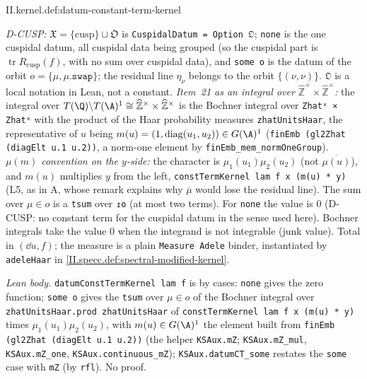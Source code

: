 \begin{tfformal}{II.kernel.def:datum-constant-term-kernel}
\begin{tffidelity}
\emph{D-CUSP:} $\mathfrak X=\{\mathrm{cusp}\}\sqcup\mathfrak O$ is \texttt{CuspidalDatum = Option 𝔒}; \texttt{none} is the one cuspidal datum, all cuspidal data being grouped (so the cuspidal part is $\operatorname{tr}R_{\mathrm{cusp}}(f)$, with no sum over cuspidal data), and \texttt{some o} is the datum of the orbit $o=\{\mu,\mu.\texttt{swap}\}$; the residual line $\eta_\nu$ belongs to the orbit $\{(\nu,\nu)\}$. \texttt{𝔒} is a local notation in Lean, not a constant. \emph{Item~21 as an integral over $\widehat{\mathbb Z}^\times\times\widehat{\mathbb Z}^\times$:} the integral over $T(\Q)\backslash T(\A)^1\cong\widehat{\mathbb Z}^\times\times\widehat{\mathbb Z}^\times$ is the Bochner integral over \texttt{Zhatˣ × Zhatˣ} with the product of the Haar probability measures \texttt{zhatUnitsHaar}, the representative of $u$ being $m(u)=(1,\operatorname{diag}(u_1,u_2))\in G(\A)^1$ (\texttt{finEmb (gl2Zhat (diagElt u.1 u.2))}, a norm-one element by \texttt{finEmb\_mem\_normOneGroup}). \emph{$\mu(m)$ convention on the $y$-side:} the character is $\mu_1(u_1)\mu_2(u_2)$ (not $\overline{\mu(u)}$), and $m(u)$ multiplies $y$ from the left, \texttt{constTermKernel lam f x (m(u) * y)} (L5, as in A, whose remark explains why $\bar\mu$ would lose the residual line). The sum over $\mu\in o$ is a \texttt{tsum} over \texttt{↥o} (at most two terms). For \texttt{none} the value is $0$ (D-CUSP: no constant term for the cuspidal datum in the sense used here). Bochner integrals take the value $0$ when the integrand is not integrable (junk value). Total in $(\dd u,f)$; the measure is a plain \texttt{Measure Adele} binder, instantiated by \texttt{adeleHaar} in \cref{II.specc.def:spectral-modified-kernel}.
\end{tffidelity}
\end{tfformal}
\noindent\emph{Lean body.} \texttt{datumConstTermKernel lam f} is by cases: \texttt{none} gives the zero function; \texttt{some o} gives the \texttt{tsum} over $\mu\in o$ of the Bochner integral over \texttt{zhatUnitsHaar.prod zhatUnitsHaar} of \texttt{constTermKernel lam f x (m(u) * y)} times $\mu_1(u_1)\mu_2(u_2)$, with $m(u)\in G(\A)^1$ the element built from \texttt{finEmb (gl2Zhat (diagElt u.1 u.2))} (the helper \texttt{KSAux.mZ}; \texttt{KSAux.mZ\_mul}, \texttt{KSAux.mZ\_one}, \texttt{KSAux.continuous\_mZ}); \texttt{KSAux.datumCT\_some} restates the \texttt{some} case with \texttt{mZ} (by \texttt{rfl}). No proof.

